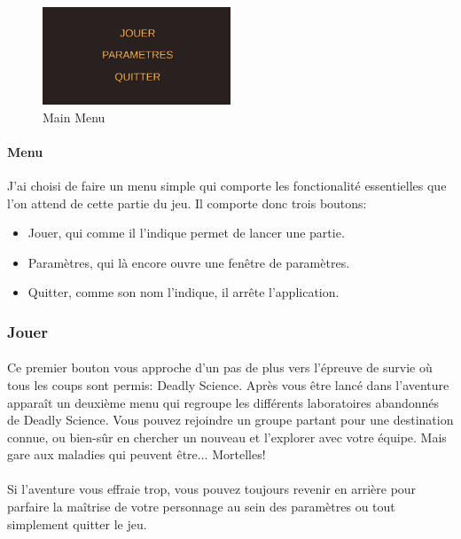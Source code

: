 \documentclass{article}
\begin{document}
\par\vspace{0.5cm}
\begin{figure}[!h]
    \centering
    \includegraphics[width=0.5\textwidth]{MainMenu.png}
    \caption{Main Menu}
    \label{Main Menu}
\end{figure}{}

\paragraph{Menu}

J'ai choisi de faire un menu simple qui comporte les fonctionalité essentielles que l'on attend de cette partie du jeu. Il comporte donc trois boutons:

\begin{itemize}
    \item Jouer, qui comme il l'indique permet de lancer une partie.
    \item Paramètres, qui là encore ouvre une fenêtre de paramètres.
    \item Quitter, comme son nom l'indique, il arrête l'application.
\end{itemize}

\subsubsection{Jouer}

\paragraph{}
Ce premier bouton vous approche d'un pas de plus vers l'épreuve de survie où tous les coups sont permis: Deadly Science. Après vous être lancé dans l'aventure apparaît un deuxième menu qui regroupe les différents laboratoires abandonnés de Deadly Science. Vous pouvez rejoindre un groupe partant pour une destination connue, ou bien-sûr en chercher un nouveau et l'explorer avec votre équipe. Mais gare aux maladies qui peuvent être... Mortelles!
\paragraph{} Si l'aventure vous effraie trop, vous pouvez toujours revenir en arrière pour parfaire la maîtrise de votre personnage au sein des paramètres ou tout simplement quitter le jeu.
\end{document}
